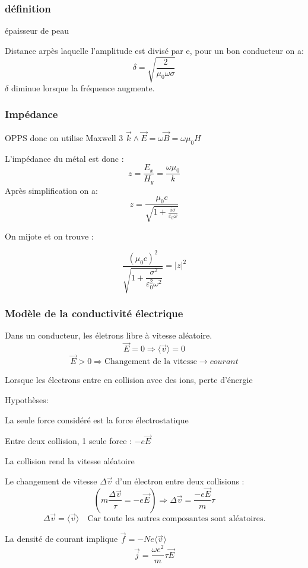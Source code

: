 \documentclass[12pt,a4paper]{report}
\begin{document}
\subsubsection{définition} épaisseur de peau

Distance arpès laquelle l'amplitude est divisé par e, pour un bon conducteur on a:
\[
	\delta = \sqrt{\dfrac{2}{\mu_0 \omega \sigma}}
\]
\(\delta\) diminue lorsque la fréquence augmente.

\subsubsection{Impédance}

OPPS donc on utilise Maxwell 3 \(\vec{k} \wedge \vec{E} = \omega \vec{B} = \omega \mu_0 H\)

L'impédance du métal est donc :
\[
	z = \dfrac{E_x}{H_y} = \dfrac{\omega \mu_0}{k}
\]
Après simplification on a:
\[
	z = \dfrac{\mu_0 c}{\sqrt{1 + \frac{i\sigma}{\varepsilon_0 \omega}}}
\]

On mijote et on trouve :

\[
	\dfrac{\left( \mu_0 c\right)^2}{\sqrt{1+\dfrac{\sigma^2}{\varepsilon^2_0 \omega^2}}} = \vert z \vert^2
\]

\subsubsection{Modèle de la conductivité électrique}

Dans un conducteur, les életrons libre à vitesse aléatoire.
\[
	\vec{E} = 0 \Rightarrow \langle \vec{v} \rangle = 0
\]
\[
	\vec{E} > 0 \Rightarrow \text{Changement de la vitesse} \rightarrow courant
\]

Lorsque les électrons entre en collision avec des ions, perte d'énergie

Hypothèses:

La seule force considéré est la force électrostatique

Entre deux collision, 1 seule force : \(-e\vec{E}\)

La collision rend la vitesse aléatoire

Le changement de vitesse \(\Delta \vec{v}\) d'un électron entre deux collisions :
\[
	\left( m \dfrac{\Delta \vec{v}}{\tau} = -e \vec{E} \right) \Rightarrow \Delta \vec{v} = \dfrac{-e \vec{E}}{m}\tau
\]
\[
	\Delta \vec{v} = \langle \vec{v} \rangle \quad \text{Car toute les autres composantes sont aléatoires.}
\]

La densité de courant implique \(\vec{f} = -N e \langle \vec{v} \rangle \)
\[
	\vec{j} = \dfrac{\omega e^2}{m}\tau \vec{E}
\]
\end{document}

